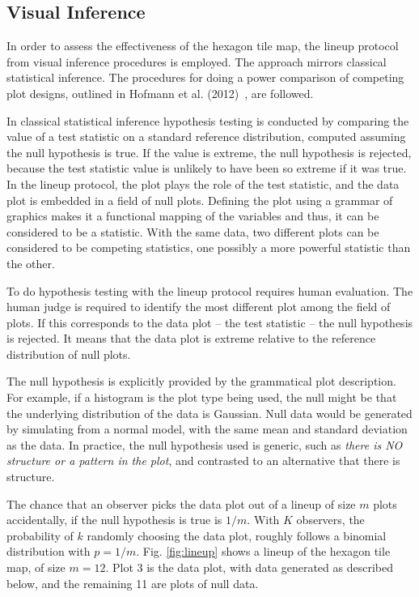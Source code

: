 \documentclass[journal]{vgtc}                     %
\begin{document}
\hypertarget{visual-inference}{%
\subsection{Visual Inference}\label{visual-inference}}

In order to assess the effectiveness of the hexagon tile map, the lineup protocol \cite{GIIV,BCHLLSW09} from visual inference procedures is employed. The approach mirrors classical statistical inference. The procedures for doing a power comparison of competing plot designs, outlined in Hofmann et al. (2012)~\cite{GTPCCD}, are followed.

In classical statistical inference hypothesis testing is conducted by comparing the value of a test statistic on a standard reference distribution, computed assuming the null hypothesis is true. If the value is extreme, the null hypothesis is rejected, because the test statistic value is unlikely to have been so extreme if it was true. In the lineup protocol, the plot plays the role of the test statistic, and the data plot is embedded in a field of null plots. Defining the plot using a grammar of graphics \cite{ggplot2} makes it a functional mapping of the variables and thus, it can be considered to be a statistic. With the same data, two different plots can be considered to be competing statistics, one possibly a more powerful statistic than the other.

To do hypothesis testing with the lineup protocol requires human evaluation. The human judge is required to identify the most different plot among the field of plots. If this corresponds to the data plot -- the test statistic -- the null hypothesis is rejected. It means that the data plot is extreme relative to the reference distribution of null plots.

The null hypothesis is explicitly provided by the grammatical plot description. For example, if a histogram is the plot type being used, the null might be that the underlying distribution of the data is Gaussian. Null data would be generated by simulating from a normal model, with the same mean and standard deviation as the data. In practice, the null hypothesis used is generic, such as \emph{there is NO structure or a pattern in the plot}, and contrasted to an alternative that there is structure.

The chance that an observer picks the data plot out of a lineup of size \(m\) plots accidentally, if the null hypothesis is true is \(1/m\). With \(K\) observers, the probability of \(k\) randomly choosing the data plot, roughly follows a binomial distribution with \(p=1/m\). Fig. \ref{fig:lineup} shows a lineup of the hexagon tile map, of size \(m=12\). Plot 3 is the data plot, with data generated as described below, and the remaining 11 are plots of null data.
\end{document}
